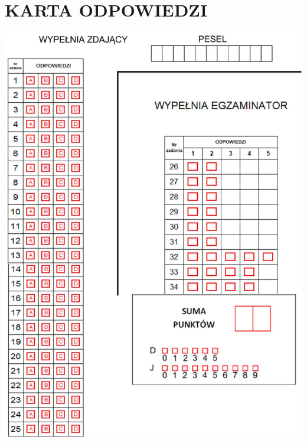 \documentclass[10pt]{article}
\begin{document}
\section*{KARTA ODPOWIEDZI}
\begin{center}
\includegraphics[max width=\textwidth]{2024_11_21_ba65d61981011633d840g-20}
\end{center}
\end{document}
